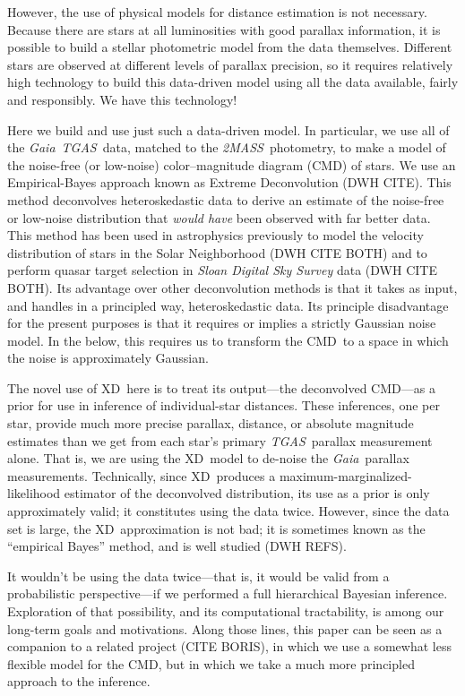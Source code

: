 \documentclass[12pt, preprint]{aastex6}
\newcommand{\acronym}[1]{{\small{#1}}}
\newcommand{\project}[1]{\textsl{#1}}
\newcommand{\tgas}{\project{\acronym{TGAS}}}
\newcommand{\tmass}{\project{\acronym{2MASS}}}
\newcommand{\gaia}{\project{Gaia}}
\newcommand{\xd}{\acronym{XD}}
\newcommand{\cmd}{\acronym{CMD}}
\begin{document}
However, the use of physical models for distance estimation is not necessary.
Because there are stars at all luminosities with good parallax information,
it is possible to build a stellar photometric model from the data themselves.
Different stars are observed at different levels of parallax precision,
so it requires relatively high technology to build this data-driven model
using all the data available, fairly and responsibly.
We have this technology!

Here we build and use just such a data-driven model.
In particular, we use all of the \gaia\ \tgas\ data, matched to the \tmass\
photometry, to make a model of the noise-free (or low-noise)
color--magnitude diagram (\cmd) of stars.
We use
an Empirical-Bayes approach known as Extreme Deconvolution (DWH CITE).
This method deconvolves heteroskedastic data to derive an estimate
of the noise-free or low-noise distribution that \emph{would have}
been observed with far better data.
This method has been used in astrophysics
previously to model the velocity distribution of stars in the Solar
Neighborhood (DWH CITE BOTH) and to perform quasar target selection
in \project{Sloan Digital Sky Survey} data (DWH CITE BOTH).
Its advantage over other deconvolution methods is that it takes as input,
and handles in a principled way, heteroskedastic data.
Its principle disadvantage for the present purposes is that it requires
or implies a strictly Gaussian noise model.
In the below, this requires us to transform the \cmd\ to a space in which
the noise is approximately Gaussian.

The novel use of \xd\ here is to treat its output---the deconvolved \cmd---as
a prior for use in inference of individual-star distances.
These inferences, one per star, provide much more precise parallax, distance,
or absolute magnitude estimates than we get from each star's primary
\tgas\ parallax measurement alone.
That is, we are using the \xd\ model to de-noise the \gaia\ parallax
measurements.
Technically, since \xd\ produces a maximum-marginalized-likelihood estimator
of the deconvolved distribution,
its use as a prior is only approximately valid; it constitutes using the
data twice.
However, since the data set is large, the \xd\ approximation is not bad; it is
sometimes known as the ``empirical Bayes'' method, and is well studied (DWH REFS).

It wouldn't be using the data twice---that is, it would be valid from a
probabilistic perspective---if we performed a full hierarchical Bayesian
inference.
Exploration of that possibility, and its computational tractability,
is among our long-term goals and motivations.
Along those lines, this paper can be seen as a companion to
a related project (CITE BORIS), in which we use a
somewhat less flexible model for the \cmd, but in which we take a much more principled
approach to the inference.
\end{document}
